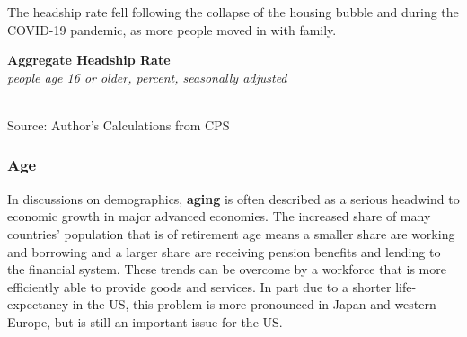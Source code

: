 \documentclass{report}
\makeatletter
\newcommand{\tbllink}[1]{\href{https://raw.githubusercontent.com/bdecon/US-chartbook/master/chartbook/data/#1}{\faTable}}
\newcommand*\short[1]{\expandafter\@gobbletwo\number\numexpr#1\relax}
\newcommand{\shdateaxisticks}{
		date coordinates in=x, axis line style={draw=none},
		xmax={2022-03-15},
		max space between ticks=40,	    
		xtick={{1990-01-01}, {1995-01-01}, {2000-01-01}, 
			{2005-01-01}, {2010-01-01}, {2015-01-01}, {2020-01-01}},
		minor xtick={},
		enlarge y limits={0.06}, enlarge x limits={0.01},
		}
\newcommand{\stdline}[4]{\addplot[very thick, no markers, color=#1] 
		table [x=#2, y=#3, col sep=comma] {#4};	}
\newcommand{\rebars}{
		\fill[color=black!10] (axis cs:{2007-12-01},\pgfkeysvalueof{/pgfplots/ymin}) rectangle 
			(axis cs:{2009-07-01}, \pgfkeysvalueof{/pgfplots/ymax});
		\fill[color=black!10] (axis cs:{2001-03-01},\pgfkeysvalueof{/pgfplots/ymin}) rectangle 
			(axis cs:{2001-11-01}, \pgfkeysvalueof{/pgfplots/ymax});
		\fill[color=black!10] (axis cs:{2020-02-01},\pgfkeysvalueof{/pgfplots/ymin}) rectangle 
			(axis cs:{2020-05-01}, \pgfkeysvalueof{/pgfplots/ymax});}
\makeatother
\begin{document}
{\begin{minipage}{0.25\textwidth}
\small The headship rate fell following the collapse of the housing bubble and during the COVID-19 pandemic, as more people moved in with family. 
\end{minipage}\hspace{6mm}
\begin{minipage}{0.47\textwidth}
\normalsize \textbf{Aggregate Headship Rate}\\
\footnotesize{\textit{people age 16 or older, percent, seasonally adjusted}}\\
\hspace*{-2mm} \\
\footnotesize{Source: Author's Calculations from CPS} \hfill \tbllink{headship.csv} 
\end{minipage}
\newpage
\begin{minipage}{0.76\textwidth}
\subsubsection*{Age}
\small In discussions on demographics, \textbf{aging} is often described as a serious headwind to economic growth in major advanced economies. The increased share of many countries' population that is of retirement age means a smaller share are working and borrowing and a larger share are receiving pension benefits and lending to the financial system. These trends can be overcome by a workforce that is more efficiently able to provide goods and services. In part due to a shorter life-expectancy in the US, this problem is more pronounced in Japan and western Europe, but is still an important issue for the US.


\end{minipage}}
\end{document}
